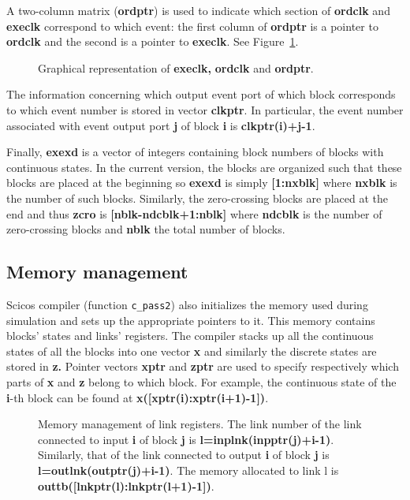 \documentclass{book}
\begin{document}
A two-column matrix ({\bf ordptr}) is used to indicate which section
of {\bf ordclk} and {\bf execlk} correspond to which event: the first column of
{\bf ordptr} is a pointer to {\bf ordclk} and the second is a pointer
to {\bf execlk}. See Figure~\ref{hihi}.

\begin{figure}[ht]

\caption{Graphical representation of {\bf execlk,} {\bf ordclk} and
{\bf ordptr}.} 
\label{hihi}
\end{figure}

The information concerning which output event port of which block
corresponds to which event number is stored in vector {\bf clkptr}. In
particular, the event number associated with event output port {\bf j}
of block {\bf i} is {\bf clkptr(i)+j-1}.

Finally, {\bf exexd} is a vector of integers containing block numbers
of blocks with continuous states. In the current version,
the blocks are organized such that these blocks are placed at the beginning so
{\bf exexd} is simply {\bf [1:nxblk]} where {\bf nxblk} is the number
of such blocks. 
Similarly, the zero-crossing blocks are placed at the end and thus
{\bf zcro} is {\bf [nblk-ndcblk+1:nblk]} where {\bf ndcblk} is the
number of zero-crossing blocks and {\bf nblk} the total number of blocks.

\subsection{Memory management}
Scicos compiler (function {\tt c\_pass2}) also initializes the memory
used during simulation and sets up the appropriate pointers to it.
This  memory contains  blocks' states and links' registers. The compiler
stacks up all the continuous states of all the blocks into one vector
{\bf x} and similarly the discrete states are stored in {\bf z.}
Pointer vectors 
{\bf xptr} and {\bf zptr} are used to specify respectively which parts
of {\bf x} and {\bf z} belong to
which block. For example, the continuous state of the {\bf i}-th block can be
found at {\bf x([xptr(i):xptr(i+1)-1])}. 


\begin{figure}[ht]

\caption{Memory management of link registers. The link number
of the link connected to input {\bf i} of block {\bf j} is {\bf
l=inplnk(inpptr(j)+i-1)}. Similarly, that
of the link connected to output {\bf i} of block {\bf j} is {\bf
l=outlnk(outptr(j)+i-1)}. The memory allocated to link l is
{\bf outtb([lnkptr(l):lnkptr(l+1)-1])}.} 
\label{indir}
\end{figure}
\end{document}
